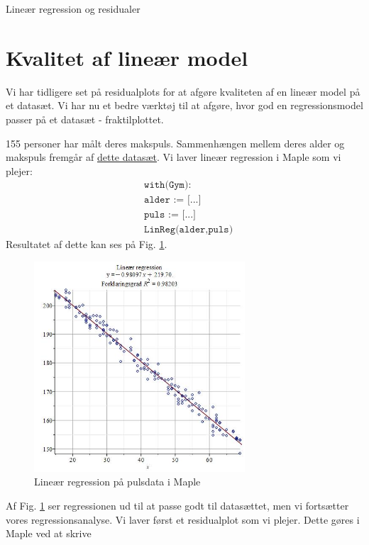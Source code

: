 \begin{center}
	\Huge
	Lineær regression og residualer
\end{center}
\section*{Kvalitet af lineær model}

Vi har tidligere set på residualplots for at afgøre kvaliteten af en lineær model på et datasæt. Vi har nu et bedre værktøj til at afgøre, hvor god en regressionsmodel passer på et datasæt - fraktilplottet. 

\begin{exa}
	155 personer har målt deres makspuls. Sammenhængen mellem deres alder og makspuls fremgår af \href{}{\color{blue!60} dette datasæt}. Vi laver lineær regression i Maple som
	vi plejer:
	\begin{align*}
		&\texttt{with(Gym):}\\
		&\texttt{alder := [...]}\\
		&\texttt{puls := [...]}\\
		&\texttt{LinReg(alder,puls)}
	\end{align*}
	Resultatet af dette kan ses på Fig. \ref{fig:linreg}.
	\begin{figure}[H]
		\centering
		\includegraphics[width=0.7\textwidth]{Billeder/linregpuls.jpg}
		\caption{Lineær regression på pulsdata i Maple}
		\label{fig:linreg}
	\end{figure}
	Af Fig. \ref{fig:linreg} ser regressionen ud til at passe godt til datasættet, men vi fortsætter vores regressionsanalyse. Vi laver først et residualplot som vi plejer. 
	Dette gøres i Maple ved at skrive

\end{exa}
